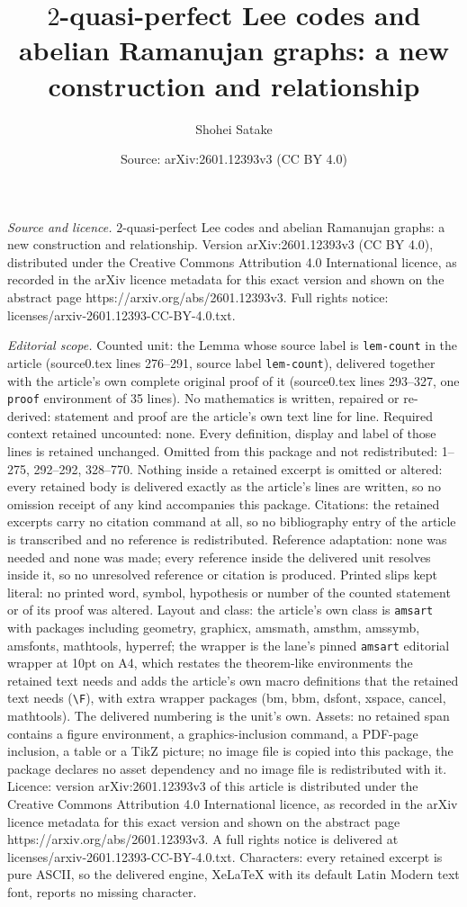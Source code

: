 \documentclass[10pt,a4paper]{amsart}
\title[$2$-quasi-perfect Lee codes and abelian Ramanujan graphs: a ]{$2$-quasi-perfect Lee codes and abelian Ramanujan graphs: a new construction and relationship}
\author{Shohei Satake}
\date{Source: arXiv:2601.12393v3 (CC BY 4.0)}
\begin{document}
\maketitle

\noindent\emph{Source and licence.} $2$-quasi-perfect Lee codes and abelian Ramanujan graphs: a new construction and relationship. Version arXiv:2601.12393v3 (CC BY 4.0), distributed under the Creative Commons Attribution 4.0 International licence, as recorded in the arXiv licence metadata for this exact version and shown on the abstract page https://arxiv.org/abs/2601.12393v3. Full rights notice: licenses/arxiv-2601.12393-CC-BY-4.0.txt.\par\smallskip

\noindent\textit{Editorial scope.} Counted unit: the Lemma whose source label is \texttt{lem-count} in the article (source0.tex lines 276--291, source label \texttt{lem-count}), delivered together with the article's own complete original proof of it (source0.tex lines 293--327, one \texttt{proof} environment of 35 lines). No mathematics is written, repaired or re-derived: statement and proof are the article's own text line for line. Required context retained uncounted: none. Every definition, display and label of those lines is retained unchanged. Omitted from this package and not redistributed: 1--275, 292--292, 328--770. Nothing inside a retained excerpt is omitted or altered: every retained body is delivered exactly as the article's lines are written, so no omission receipt of any kind accompanies this package. Citations: the retained excerpts carry no citation command at all, so no bibliography entry of the article is transcribed and no reference is redistributed. Reference adaptation: none was needed and none was made; every reference inside the delivered unit resolves inside it, so no unresolved reference or citation is produced. Printed slips kept literal: no printed word, symbol, hypothesis or number of the counted statement or of its proof was altered. Layout and class: the article's own class is \texttt{amsart} with packages including geometry, graphicx, amsmath, amsthm, amssymb, amsfonts, mathtools, hyperref; the wrapper is the lane's pinned \texttt{amsart} editorial wrapper at 10pt on A4, which restates the theorem-like environments the retained text needs and adds the article's own macro definitions that the retained text needs (\texttt{\textbackslash F}), with extra wrapper packages (bm, bbm, dsfont, xspace, cancel, mathtools). The delivered numbering is the unit's own. Assets: no retained span contains a figure environment, a graphics-inclusion command, a PDF-page inclusion, a table or a TikZ picture; no image file is copied into this package, the package declares no asset dependency and no image file is redistributed with it. Licence: version arXiv:2601.12393v3 of this article is distributed under the Creative Commons Attribution 4.0 International licence, as recorded in the arXiv licence metadata for this exact version and shown on the abstract page https://arxiv.org/abs/2601.12393v3. A full rights notice is delivered at licenses/arxiv-2601.12393-CC-BY-4.0.txt. Characters: every retained excerpt is pure ASCII, so the delivered engine, XeLaTeX with its default Latin Modern text font, reports no missing character.
\end{document}
